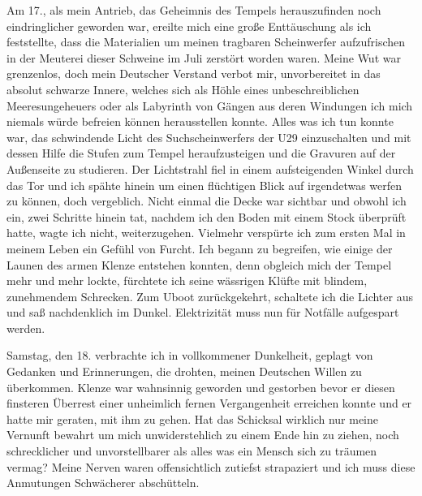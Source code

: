 \documentclass[a4paper]{memoir}
\begin{document}
Am 17., als mein Antrieb, das Geheimnis des Tempels herauszufinden noch eindringlicher geworden war, ereilte mich eine große Enttäuschung als ich feststellte, dass die Materialien um meinen tragbaren Scheinwerfer aufzufrischen in der Meuterei dieser Schweine im Juli zerstört worden waren. Meine Wut war grenzenlos, doch mein Deutscher Verstand verbot mir, unvorbereitet in das absolut schwarze Innere, welches sich als Höhle eines unbeschreiblichen Meeresungeheuers oder als Labyrinth von Gängen aus deren Windungen ich mich niemals würde befreien können herausstellen konnte. Alles was ich tun konnte war, das schwindende Licht des Suchscheinwerfers der U29 einzuschalten und mit dessen Hilfe die Stufen zum Tempel heraufzusteigen und die Gravuren auf der Außenseite zu studieren. Der Lichtstrahl fiel in einem aufsteigenden Winkel durch das Tor und ich spähte hinein um einen flüchtigen Blick auf irgendetwas werfen zu können, doch vergeblich. Nicht einmal die Decke war sichtbar und obwohl ich ein, zwei Schritte hinein tat, nachdem ich den Boden mit einem Stock überprüft hatte, wagte ich nicht, weiterzugehen. Vielmehr verspürte ich zum ersten Mal in meinem Leben ein Gefühl von Furcht. Ich begann zu begreifen, wie einige der Launen des armen Klenze entstehen konnten, denn obgleich mich der Tempel mehr und mehr lockte, fürchtete ich seine wässrigen Klüfte mit blindem, zunehmendem Schrecken. Zum Uboot zurückgekehrt, schaltete ich die Lichter aus und saß nachdenklich im Dunkel. Elektrizität muss nun für Notfälle aufgespart werden.

Samstag, den 18. verbrachte ich in vollkommener Dunkelheit, geplagt von Gedanken und Erinnerungen, die drohten, meinen Deutschen Willen zu überkommen.
Klenze war wahnsinnig geworden und gestorben bevor er diesen finsteren Überrest einer unheimlich fernen Vergangenheit erreichen konnte und er hatte mir geraten, mit ihm zu gehen. Hat das Schicksal wirklich nur meine Vernunft bewahrt um mich unwiderstehlich zu einem Ende hin zu ziehen, noch schrecklicher und unvorstellbarer als alles was ein Mensch sich zu träumen vermag? Meine Nerven waren offensichtlich zutiefst strapaziert und ich muss diese Anmutungen Schwächerer abschütteln.
\end{document}

